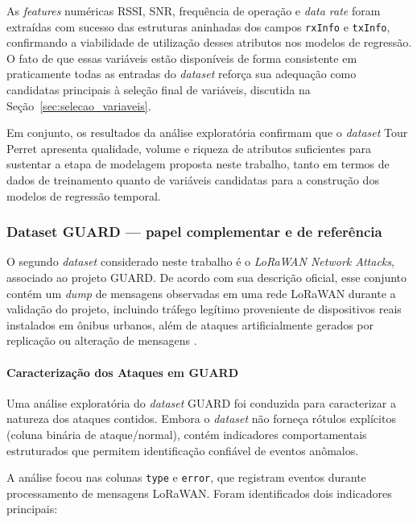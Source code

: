 As \textit{features} numéricas RSSI, SNR, frequência de operação e 
\textit{data rate} foram extraídas com sucesso das estruturas aninhadas dos 
campos \texttt{rxInfo} e \texttt{txInfo}, confirmando a viabilidade de 
utilização desses atributos nos modelos de regressão. O fato de que essas 
variáveis estão disponíveis de forma consistente em praticamente todas as 
entradas do \textit{dataset} reforça sua adequação como candidatas principais 
à seleção final de variáveis, discutida na 
Seção~\ref{sec:selecao_variaveis}.

Em conjunto, os resultados da análise exploratória confirmam que o 
\textit{dataset} Tour Perret apresenta qualidade, volume e riqueza de 
atributos suficientes para sustentar a etapa de modelagem proposta neste 
trabalho, tanto em termos de dados de treinamento quanto de variáveis 
candidatas para a construção dos modelos de regressão temporal.


\subsubsection{Dataset GUARD — papel complementar e de referência}

O segundo \textit{dataset} considerado neste trabalho é o 
\textit{LoRaWAN Network Attacks}, associado ao projeto GUARD. De acordo com 
sua descrição oficial, esse conjunto contém um \textit{dump} de mensagens 
observadas em uma rede LoRaWAN durante a validação do projeto, incluindo 
tráfego legítimo proveniente de dispositivos reais instalados em ônibus 
urbanos, além de ataques artificialmente gerados por replicação ou alteração 
de mensagens \cite{guard_dataset}.


\paragraph{Caracterização dos Ataques em GUARD}

Uma análise exploratória do \textit{dataset} GUARD foi conduzida para 
caracterizar a natureza dos ataques contidos. Embora o \textit{dataset} 
não forneça rótulos explícitos (coluna binária de ataque/normal), contém 
indicadores comportamentais estruturados que permitem identificação 
confiável de eventos anômalos.

A análise focou nas colunas \texttt{type} e \texttt{error}, que registram 
eventos durante processamento de mensagens LoRaWAN. Foram identificados dois 
indicadores principais:

